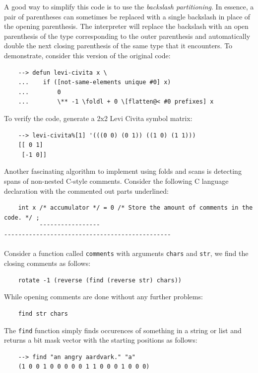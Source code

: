 A good way to simplify this code is to use the \textit{backslash partitioning}. In essence, a pair of parentheses can sometimes be replaced with a single backslash in place of the opening parenthesis. The interpreter will replace the backslash with an open parenthesis of the type corresponding to the outer parenthesis and automatically double the next closing parenthesis of the same type that it encounters. To demonstrate, consider this version of the original code:

\begin{Verbatim}
    --> defun levi-civita x \
    ...    if ([not-same-elements unique #0] x)
    ...        0
    ...        \** -1 \foldl + 0 \[flatten@< #0 prefixes] x
\end{Verbatim}

To verify the code, generate a 2x2 Levi Civita symbol matrix:

\begin{Verbatim}
    --> levi-civita%[1] '(((0 0) (0 1)) ((1 0) (1 1)))
    [[ 0 1]
     [-1 0]]
\end{Verbatim}

Another fascinating algorithm to implement using folds and scans is detecting spans of non-nested C-style comments. Consider the following C language declaration with the commented out parts underlined:

\begin{Verbatim}
    int x /* accumulator */ = 0 /* Store the amount of comments in the code. */ ;
          ¯¯¯¯¯¯¯¯¯¯¯¯¯¯¯¯¯     ¯¯¯¯¯¯¯¯¯¯¯¯¯¯¯¯¯¯¯¯¯¯¯¯¯¯¯¯¯¯¯¯¯¯¯¯¯¯¯¯¯¯¯¯¯¯¯
\end{Verbatim}

Consider a function called \verb|comments| with arguments \verb|chars| and \verb|str|, we find the closing comments as follows:

\begin{Verbatim}
    rotate -1 (reverse (find (reverse str) chars))
\end{Verbatim}

While opening comments are done without any further problems:

\begin{Verbatim}
    find str chars
\end{Verbatim}

The \verb|find| function simply finds occurences of something in a string or list and returns a bit mask vector with the starting positions as follows:

\begin{Verbatim}
    --> find "an angry aardvark." "a"
    (1 0 0 1 0 0 0 0 0 1 1 0 0 0 1 0 0 0)
\end{Verbatim}

